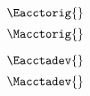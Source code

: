 

\begin{landscape}

\linespread{1}


\sectionsep{}

{
\begin{equation}
  \Eacctorig{}
\end{equation}
}
{
\begin{equation}
  \Macctorig{}
\end{equation}
}

\sectionsep{}

{
\begin{equation}
  \Eacctadev{}
\end{equation}
}
{
\begin{equation}
  \Macctadev{}
\end{equation}
}

\sectionsep{}

\derivsection{}
{
~
  
}
\end{landscape}
